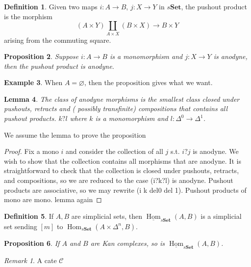 \documentclass{article}
\theoremstyle{definition}
\newtheorem{defn}{Definition}[section]
\newtheorem{example}[defn]{Example}
\theoremstyle{remark}
\newtheorem{rem}{Remark}
\theoremstyle{plain}
\newtheorem{lem}[defn]{Lemma}
\newtheorem{prop}[defn]{Proposition}
\newcommand{\Hom}{\operatorname{Hom}}
\newcommand{\bset}{\mathbf{Set}}
\begin{document}
\begin{defn}
    Given two maps $i:A\to B$, $j:X\to Y$ in $s\bset$, the pushout product is the morphism
    \[(A\times Y)\coprod_{A\times X} (B\times X)\to B\times Y\]
    arising from the commuting square.
\end{defn}
\begin{prop}
    Suppose $i:A\to B$ is a monomorphism and $j:X\to Y$ is anodyne, then the pushout product is anodyne.
\end{prop}
\begin{example}
    When $A=\varnothing$, then the proposition gives what we want.
\end{example}
\begin{lem}
    The class of anodyne morphisms is the smallest class closed under pushouts, retracts and ( possibly transfinite) compositions that contains all pushout products. $k?l$ where $k$ is a monomorphism and $l:\Delta^0\to\Delta^1$.
\end{lem}
We assume the lemma to prove the proposition
\begin{proof}
    Fix a mono $i$ and consider the collection of all $j$ s.t. $i?j $ is anodyne. We wish to show that the collection contains all morphisms that are anodyne. It is straightforward to check that the collection is closed under pushouts, retracts, and compositions, so we are reduced to the case (i?k?l) is anodyne. Pushout products are associative, so we may rewrite (i k del0 del 1). Pushout products of mono are mono. lemma again
\end{proof}

\begin{defn}
    If $A,B$ are simplicial sets, then $\underline{\Hom}_{s\bset}(A,B)$ is a simplicial set sending $[m]$ to $\Hom_{s\bset}(A\times\Delta^n,B)$.
\end{defn}
\begin{prop}
    If $A$ and $B$ are Kan complexes, so is $\underline{\Hom}_{s\bset}(A,B)$.
\end{prop}
\begin{rem}
    A cate $\mathscr C$
\end{rem}
\end{document}
